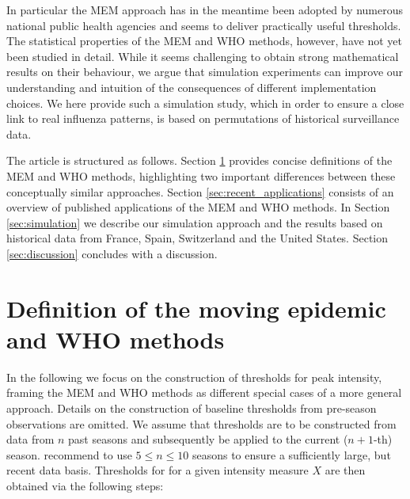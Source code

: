 \documentclass{article}
\begin{document}
In particular the MEM approach has in the meantime been adopted by numerous national public health agencies and seems to deliver practically useful thresholds. The statistical properties of the MEM and WHO methods, however, have not yet been studied in detail. While it seems challenging to obtain strong mathematical results on their behaviour, we argue that simulation experiments can improve our understanding and intuition of the consequences of different implementation choices. We here provide such a simulation study, which in order to ensure a close link to real influenza patterns, is based on permutations of historical surveillance data.

The article is structured as follows. Section \ref{sec:definitions} provides concise definitions of the MEM and WHO methods, highlighting two important differences between these conceptually similar approaches. Section \ref{sec:recent_applications} consists of an overview of published applications of the MEM and WHO methods. In Section \ref{sec:simulation} we describe our simulation approach and the results based on historical data from France, Spain, Switzerland and the United States. Section \ref{sec:discussion} concludes with a discussion.

\section{Definition of the moving epidemic and WHO methods}
\label{sec:definitions}

In the following we focus on the construction of thresholds  for peak intensity, framing the MEM and WHO methods as different special cases of a more general approach. Details on the construction of baseline thresholds from pre-season observations are omitted. We assume that thresholds are to be constructed from data from $n$ past seasons and subsequently be applied to the current ($n + 1$-th) season. \cite{Vega2015} recommend to use $5 \leq n \leq 10$ seasons to ensure a sufficiently large, but recent data basis. Thresholds for for a given intensity measure $X$ are then obtained via the following steps:
\end{document}
